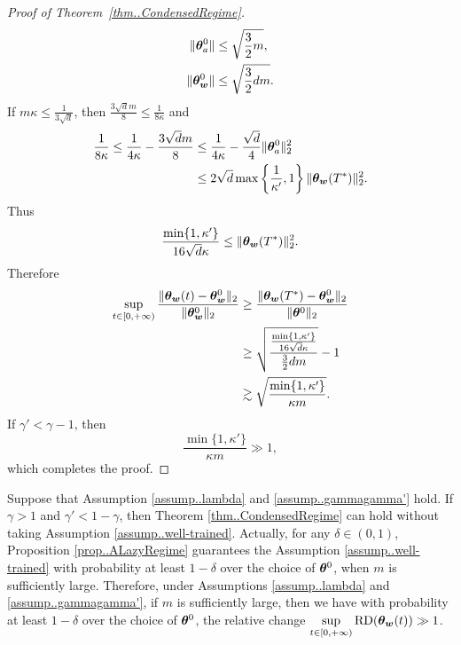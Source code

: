 \documentclass[twoside,11pt]{article}
\begin{document}
\begin{proof}[Proof of Theorem~\ref{thm..CondensedRegime}]
    \begin{align*}
        \lVert\bm{\theta}^0_{a}\rVert
        &\leq \sqrt{\frac{3}{2}m},\\
        \lVert\bm{\theta}^0_{\bm{w}}\rVert
        &\leq \sqrt{\frac{3}{2}dm}.
    \end{align*}
    If $m\kappa\leq \frac{1}{3\sqrt{d}}$, then $\frac{3\sqrt{d}m}{8}\leq \frac{1}{8\kappa}$ and
    \begin{align*}
        \frac{1}{8\kappa}
        \leq \frac{1}{4\kappa}-\frac{3\sqrt{d}m}{8}
        &\leq \frac{1}{4\kappa}-\frac{\sqrt{d}}{4}\lVert\bm{\theta}_{a}^0\rVert_2^2\\
        &\leq 2\sqrt{d}\max\left\{\frac{1}{\kappa'},1\right\}\lVert\bm{\theta}_{\bm{w}}(T^*)\rVert_2^2.
    \end{align*}
    Thus
    \begin{equation*}
        \frac{\min\{1,\kappa'\}}{16\sqrt{d}\kappa}\leq \lVert\bm{\theta}_{\bm{w}}(T^*)\rVert_2^2.
    \end{equation*}
    Therefore
    \begin{equation*}
        \begin{aligned}
            \sup\limits_{t\in[0,+\infty)}\frac{\lVert\bm{\theta}_{\bm{w}}(t)-\bm{\theta}_{\bm{w}}^0\rVert_2}{\lVert\bm{\theta}^0_{\bm{w}}\rVert_2}
             & \geq \frac{\lVert\bm{\theta}_{\bm{w}}(T^*)-\bm{\theta}_{\bm{w}}^0\rVert_2}{\lVert\bm{\theta}^0\rVert_2}                                      \\
             & \geq \sqrt{\frac{\frac{\min\{1,\kappa'\}}{16\sqrt{d}\kappa}
             }{\frac{3}{2}dm}} - 1 \\
             & \gtrsim \sqrt{\frac{\min\{1,\kappa'\}}{\kappa m}}.
        \end{aligned}
    \end{equation*}
    If $\gamma'<\gamma-1$, then
    \begin{equation*}
        \frac{\min\{1,\kappa'\}}{\kappa m}\gg 1,
    \end{equation*}
    which completes the proof.
\end{proof}
\begin{rmk}
    Suppose that Assumption \ref{assump..lambda} and \ref{assump..gammagamma'} hold. If $\gamma>1$ and $\gamma'<1-\gamma$, then Theorem \ref{thm..CondensedRegime} can hold without taking Assumption \ref{assump..well-trained}. Actually, for any $\delta\in(0,1)$, Proposition \ref{prop..ALazyRegime} guarantees the Assumption \ref{assump..well-trained} with probability at least $1-\delta$ over the choice of $\bm{\theta}^0$, when $m$ is sufficiently large. Therefore, under Assumptions \ref{assump..lambda} and \ref{assump..gammagamma'}, if $m$ is sufficiently large, then we have with probability at least $1-\delta$ over the choice of $\bm{\theta}^0$, the relative change $\sup\limits_{t\in[0,+\infty)}\mathrm{RD}(\bm{\theta}_{\bm{w}}(t))\gg 1$.
\end{rmk}
\end{document}
